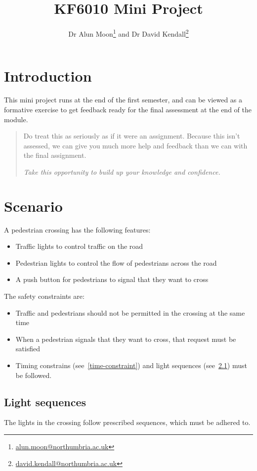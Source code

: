 \documentclass{article}
\title{KF6010 Mini Project}
\author{Dr Alun Moon\thanks{\url{alun.moon@northumbria.ac.uk}} and
Dr David Kendall\thanks{\url{david.kendall@northumbria.ac.uk}}}
\begin{document}
\maketitle

\begin{abstract}
\end{abstract}

\section{Introduction}
	This mini project runs at the end of the first semester, and can be viewed
	as a formative exercise to get feedback ready for the final assessment at
	the end of the module.
	\begin{quote}
		Do treat this as seriously as if it were an assignment.
		Because this isn't assessed, we can give you much more help and
		feedback than we can with the final assignment.  

		\emph{Take this opportunity to build up your knowledge and confidence.}
	\end{quote}

\section{Scenario}
A pedestrian crossing has the following features:
\begin{itemize}
	\item Traffic lights to control traffic on the road
	\item Pedestrian lights to control the flow of pedestrians across the road
	\item A push button for pedestrians to signal that they want to cross
\end{itemize}
The safety constraints are:
\begin{itemize}
	\item Traffic and pedestrians should not be permitted in the crossing at
		the same time
	\item When a pedestrian signals that they want to cross, that request must
		be satisfied
	\item Timing constrains (see~\ref{time-constraint}) and light
		sequences (see~\ref{light-sequence}) must be followed.
\end{itemize}

\clearpage
\subsection{Light sequences}\label{light-sequence}
The lights in the crossing follow prescribed sequences, which must be adhered
to.
\end{document}
